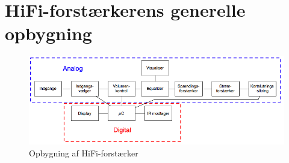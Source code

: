 \section{HiFi-forstærkerens generelle opbygning}

\begin{figure}[h]
\centering
\includegraphics[scale=.6]{generel_effektforstaerker/forstaerker_opbygning.png}
\caption{Opbygning af HiFi-forstærker}
\label{}
\end{figure}